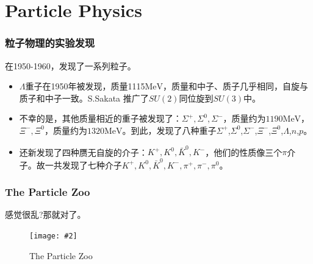 \documentclass[CJK]{beamer}
\newcommand{\cpic}[2]{
\begin{center}
\texttt{[image: \#2]}
\end{center}
}
\newcommand{\cpicn}[3]
{
\begin{figure}[h!]
\cpic{#1}{#2}
\caption{#3\label{#2}}
\end{figure}
}
\begin{document}
\section{Particle Physics}
\begin{frame}\frametitle{\bch 粒子物理的实验发现\ech}
  \bch
  在1950-1960，发现了一系列粒子。
  \begin{itemize}
  \item $\Lambda$重子在1950年被发现，质量1115$\mathrm{MeV}$，质量和中子、质子几乎相同，自旋与质子和中子一致。S.Sakata 推广了$SU(2)$同位旋到$SU(3)$中。
  \item 不幸的是，其他质量相近的重子被发现了：$\Sigma^{+},\Sigma^0,\Sigma^-$，质量约为$1190\mathrm{MeV}$，$\Xi^-,\Xi^0$，质量约为$1320\mathrm{MeV}$。到此，发现了八种重子$\Sigma^{+}$,$\Sigma^0$,$\Sigma^-$,$\Xi^-$,$\Xi^0$,$\Lambda$,$n$,$p$。
    \item 还新发现了四种赝无自旋的介子：$K^+,K^0,\bar{K}^0,K^-$，他们的性质像三个$\pi$介子。故一共发现了七种介子$K^+,K^0,\bar{K}^0,K^-,\pi^+,\pi^-,\pi^0$。
  \end{itemize}
  \ech
\end{frame}
\begin{frame}\frametitle{The Particle Zoo}
  \bch
  感觉很乱?那就对了。
  \cpicn{0.25}{zoo}{The Particle Zoo}
  \ech
\end{frame}
\end{document}
